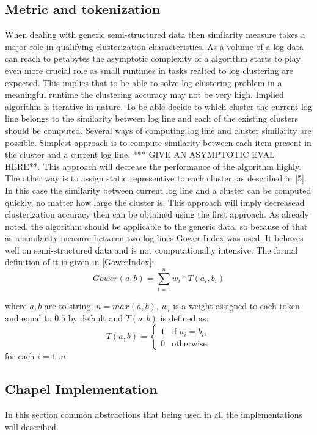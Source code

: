 \documentclass{article}
\begin{document}
\subsection{Metric and tokenization}
When dealing with generic semi-structured data then similarity measure takes a major role in qualifying clusterization characteristics. As a volume of a log data can reach to petabytes the asymptotic complexity of a algorithm starts to play even more crucial role as small runtimes in tasks realted to log clustering are expected. This implies that to be able to solve log clustering problem in a meaningful runtime the clustering accuracy may not be very high. Implied algorithm is iterative in nature. To be able decide to which cluster the current log line belongs to the similarity between log line and each of the existing clusters should be computed. Several ways of computing log line and cluster similarity are possible. Simplest approach is to compute similarity between each item present in the cluster and a current log line. *** GIVE AN ASYMPTOTIC EVAL HERE**. This approach will decrease the performance of the algorithm highly. The other way is to assign static representive to each cluster, as described in [5]. In this case the similarity between current log line and a cluster can be computed quickly, no matter how large the cluster is. This approach will imply decreasead clusterization accuracy then can be obtained using the first approach. As already noted, the algorithm should be applicable to the generic data, so because of that as a similarity measure between two log lines Gower Index was used. It behaves well on semi-structured data and is not computationally intensive. The formal definition of it is given in \ref{GowerIndex}: 
\begin{equation}\label{GowerIndex}
	Gower(a, b)=\sum_{i=1}^{n}w_{i}*T(a_{i}, b_{i})
\end{equation}

where $a, b$ are to string, $n=max(a, b)$, $w_{i}$ is a weight assigned to each token and equal to $0.5$ by default and $T(a, b)$ is defined as:
\begin{equation}\label{TokenSimilarity}
	T(a, b)=\begin{cases}
		1& \text{if $a_{i} = b_{i}$},\\
		0& \text{otherwise}
	\end{cases}
\end{equation}
for each $i=1..n$.

\subsection{Chapel Implementation}
In this section common abstractions that being used in all the implementations will described.
\end{document}

